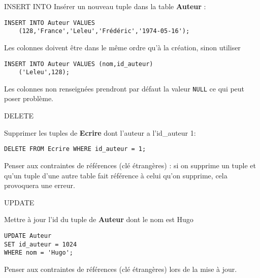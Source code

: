 \documentclass[10pt]{nsibeamer}
\begin{document}
\begin{frame}[fragile]{INSERT INTO}
Insérer un nouveau tuple dans la table \textbf{Auteur} :\pause
\begin{verbatim}
INSERT INTO Auteur VALUES
    (128,'France','Leleu','Frédéric','1974-05-16');
\end{verbatim}
\pause
Les colonnes doivent être dans le même ordre qu'à la création, sinon utiliser\pause
\begin{verbatim}
INSERT INTO Auteur VALUES (nom,id_auteur)
    ('Leleu',128);
\end{verbatim}
\pause
Les colonnes non renseignées prendront par défaut la valeur \texttt{NULL} ce qui peut poser problème.
\end{frame}

\begin{frame}[fragile]{DELETE}

Supprimer les tuples de \textbf{Ecrire} dont l'auteur a l'id\_auteur 1:\pause
\begin{verbatim}
DELETE FROM Ecrire WHERE id_auteur = 1;
\end{verbatim}
\pause
Penser aux contraintes de références (clé étrangères) : si on supprime un tuple et qu'un tuple d'une autre table fait référence à celui qu'on supprime, cela provoquera une erreur.
\end{frame}

\begin{frame}[fragile]{UPDATE}

	Mettre à jour l'id du tuple de \textbf{Auteur} dont le nom est Hugo\pause
	\begin{verbatim}
UPDATE Auteur
SET id_auteur = 1024
WHERE nom = 'Hugo';
	\end{verbatim}
    \pause
Penser aux contraintes de références (clé étrangères) lors de la mise à jour.
\end{frame}
\end{document}
